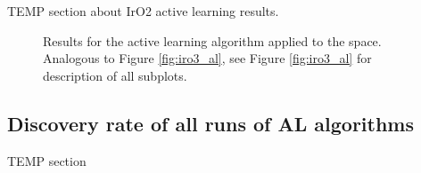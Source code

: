 %
%
TEMP section about IrO2 active learning results.




\begin{figure}[!htb]
\centering
{}
\caption{\label{fig:iro2_al}
%
Results for the active learning algorithm applied to the \IrOtwo space.
%
Analogous to Figure \ref{fig:iro3_al}, see Figure \ref{fig:iro3_al} for description of all subplots.
}
\end{figure}


\subsection{Discovery rate of all runs of AL algorithms} %


%
%
TEMP section


